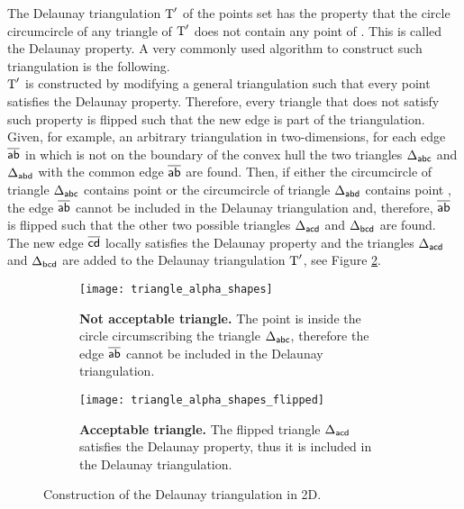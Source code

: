 The Delaunay triangulation $\mbox{$\textup{T}$}^{\prime}$ of the points set  has the property that the circle circumcircle of any triangle of $\mbox{$\textup{T}$}^{\prime}$ does not contain any point of . This is called the Delaunay property. A very commonly used algorithm to construct such triangulation is the following.\\ \indent 
$\mbox{$\textup{T}$}^\prime$ is constructed by modifying a general triangulation  such that every point satisfies the Delaunay property. 
Therefore, every triangle that does not satisfy such property is flipped such that the new edge is part of the triangulation. 
Given, for example, an arbitrary triangulation  in two-dimensions, for each edge $\overline{\textsf{ab}}$ in  which is not on the boundary of the convex hull the two triangles 
$\Delta_{\textsf{abc}}$ and $\Delta_{\textsf{abd}}$ with the common edge $\overline{\textsf{ab}}$ are found. Then, if either the circumcircle of triangle $\Delta_{\textsf{abc}}$ contains point  or the circumcircle of triangle $\Delta_{\textsf{abd}}$ contains point , the edge $\overline{\textsf{ab}}$ cannot be included in the Delaunay triangulation and, therefore, $\overline{\textsf{ab}}$ is flipped such that the other two possible triangles $\Delta_{\textsf{acd}}$ and $\Delta_{\textsf{bcd}}$ are found. The new edge $\overline{\textsf{cd}}$ locally satisfies the Delaunay property and the triangles $\Delta_{\textsf{acd}}$ and  $\Delta_{\textsf{bcd}}$ are added to the Delaunay triangulation $\mbox{$\textup{T}$}^\prime$, see Figure \ref{fig:Delaunay}.  
\begin{figure}[t]\label{fig:Delaunay}
\begin{subfigure}[t]{0.48\textwidth}
\centering
\texttt{[image: triangle\_alpha\_shapes]}
\label{fig:shape}
\caption{\textbf{Not acceptable triangle.} The point  is inside the circle circumscribing the triangle $\Delta_{\textsf{abc}}$, therefore the edge $\overline{\textsf{ab}}$ cannot be included in the Delaunay triangulation.}
\end{subfigure}
\hfill
\begin{subfigure}[t]{0.48\textwidth}
\centering
\texttt{[image: triangle\_alpha\_shapes\_flipped]}
\caption{\textbf{Acceptable triangle.} The flipped triangle $\Delta_{\textsf{acd}}$ satisfies the Delaunay property, thus it is included in the Delaunay triangulation.}
\end{subfigure}
\caption{Construction of the Delaunay triangulation in 2D.}
\label{fig:Delaunay}
\end{figure}

